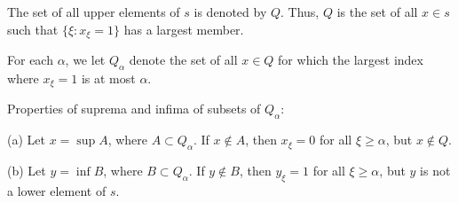 The set of all upper elements of $s$ is denoted by $Q$. Thus, $Q$ is the set of all $x \in s$ such that $\{\xi : x_\xi = 1\}$ has a largest member.

For each $\alpha$, we let $Q_\alpha$ denote the set of all $x \in Q$ for which the largest index where $x_\xi = 1$ is at most $\alpha$.

Properties of suprema and infima of subsets of $Q_\alpha$:

(a) Let $x = \sup A$, where $A \subset Q_\alpha$. If $x \notin A$, then $x_\xi = 0$ for all $\xi \geq \alpha$, but $x \notin Q$.

(b) Let $y = \inf B$, where $B \subset Q_\alpha$. If $y \notin B$, then $y_\xi = 1$ for all $\xi \geq \alpha$, but $y$ is not a lower element of $s$.
